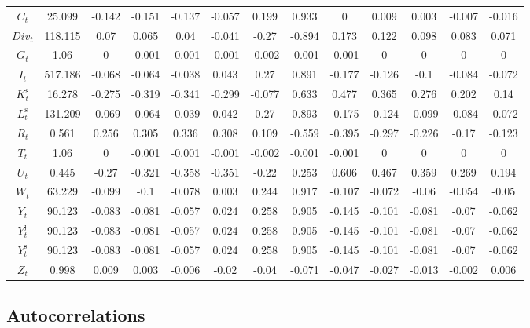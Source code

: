 \begin{tabular}{c|c|c|c|c|c|c|c|c|c|c|c|c|}
$C_{t}$ & 25.099 & -0.142 & -0.151 & -0.137 & -0.057 & 0.199 & 0.933 & 0 & 0.009 & 0.003 & -0.007 & -0.016 \\
${D\!i\!v}_{t}$ & 118.115 & 0.07 & 0.065 & 0.04 & -0.041 & -0.27 & -0.894 & 0.173 & 0.122 & 0.098 & 0.083 & 0.071 \\
$G_{t}$ & 1.06 & 0 & -0.001 & -0.001 & -0.001 & -0.002 & -0.001 & -0.001 & 0 & 0 & 0 & 0 \\
$I_{t}$ & 517.186 & -0.068 & -0.064 & -0.038 & 0.043 & 0.27 & 0.891 & -0.177 & -0.126 & -0.1 & -0.084 & -0.072 \\
$K^{\mathrm{s}}_{t}$ & 16.278 & -0.275 & -0.319 & -0.341 & -0.299 & -0.077 & 0.633 & 0.477 & 0.365 & 0.276 & 0.202 & 0.14 \\
$L^{\mathrm{s}}_{t}$ & 131.209 & -0.069 & -0.064 & -0.039 & 0.042 & 0.27 & 0.893 & -0.175 & -0.124 & -0.099 & -0.084 & -0.072 \\
$R_{t}$ & 0.561 & 0.256 & 0.305 & 0.336 & 0.308 & 0.109 & -0.559 & -0.395 & -0.297 & -0.226 & -0.17 & -0.123 \\
$T_{t}$ & 1.06 & 0 & -0.001 & -0.001 & -0.001 & -0.002 & -0.001 & -0.001 & 0 & 0 & 0 & 0 \\
$U_{t}$ & 0.445 & -0.27 & -0.321 & -0.358 & -0.351 & -0.22 & 0.253 & 0.606 & 0.467 & 0.359 & 0.269 & 0.194 \\
$W_{t}$ & 63.229 & -0.099 & -0.1 & -0.078 & 0.003 & 0.244 & 0.917 & -0.107 & -0.072 & -0.06 & -0.054 & -0.05 \\
$Y_{t}$ & 90.123 & -0.083 & -0.081 & -0.057 & 0.024 & 0.258 & 0.905 & -0.145 & -0.101 & -0.081 & -0.07 & -0.062 \\
$Y^{\mathrm{j}}_{t}$ & 90.123 & -0.083 & -0.081 & -0.057 & 0.024 & 0.258 & 0.905 & -0.145 & -0.101 & -0.081 & -0.07 & -0.062 \\
$Y^{\mathrm{s}}_{t}$ & 90.123 & -0.083 & -0.081 & -0.057 & 0.024 & 0.258 & 0.905 & -0.145 & -0.101 & -0.081 & -0.07 & -0.062 \\
$Z_{t}$ & 0.998 & 0.009 & 0.003 & -0.006 & -0.02 & -0.04 & -0.071 & -0.047 & -0.027 & -0.013 & -0.002 & 0.006 \\
\hline
\end{tabular}


\subsection{Autocorrelations}

